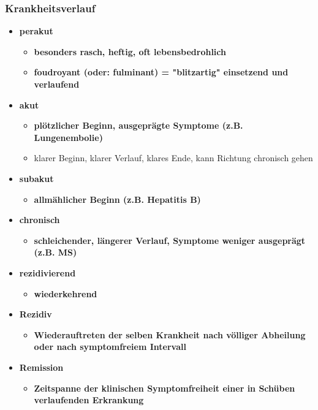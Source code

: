 \subsubsection{Krankheitsverlauf}
	\begin{itemize}
		\item \textbf{perakut}
			\begin{itemize}
				\item \textbf{besonders rasch, heftig, oft lebensbedrohlich}
				\item \textbf{foudroyant (oder: fulminant) = "blitzartig" einsetzend und verlaufend}
			\end{itemize}
		\item \textbf{akut}
			\begin{itemize}
				\item \textbf{plötzlicher Beginn, ausgeprägte Symptome (z.B. Lungenembolie)}
				\item klarer Beginn, klarer Verlauf, klares Ende, kann Richtung chronisch gehen
			\end{itemize}
		\item \textbf{subakut}
			\begin{itemize}
				\item \textbf{allmählicher Beginn (z.B. Hepatitis B)}
			\end{itemize}
		\item \textbf{chronisch}
			\begin{itemize}
				\item \textbf{schleichender, längerer Verlauf, Symptome weniger ausgeprägt (z.B. MS)}
			\end{itemize}
		\item \textbf{rezidivierend}
			\begin{itemize}
				\item \textbf{wiederkehrend}
			\end{itemize}
		\item \textbf{Rezidiv}
			\begin{itemize}
				\item \textbf{Wiederauftreten der selben Krankheit nach völliger Abheilung oder nach symptomfreiem Intervall}
			\end{itemize}
		\item \textbf{Remission}
			\begin{itemize}
				\item \textbf{Zeitspanne der klinischen Symptomfreiheit einer in Schüben verlaufenden Erkrankung}
			\end{itemize}
	\end{itemize}

